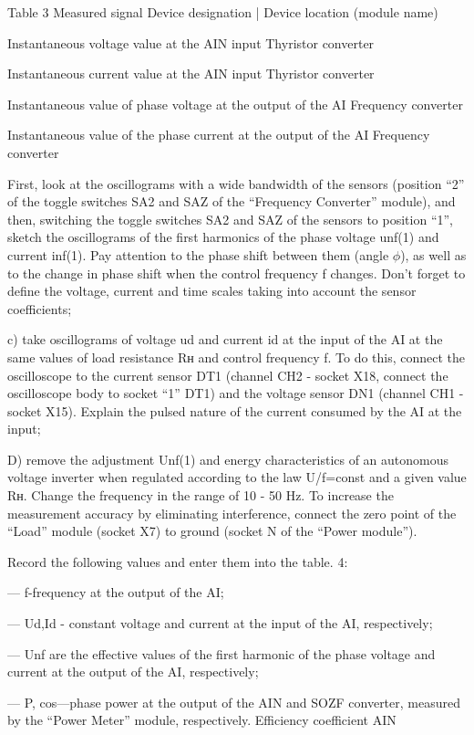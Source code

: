 \documentclass[a4paper,14pt]{article}
\begin{document}
Table 3
Measured signal
Device designation
| Device location
(module name)

Instantaneous voltage value at the AIN input
Thyristor converter


Instantaneous current value at the AIN input
  Thyristor converter

Instantaneous value of phase voltage at the output of the AI
Frequency converter

Instantaneous value of the phase current at the output of the AI
Frequency converter


First, look at the oscillograms with a wide bandwidth of the sensors (position “2” of the toggle switches SA2 and SAZ of the “Frequency Converter” module), and then, switching the toggle switches SA2 and SAZ of the sensors to position “1”, sketch the oscillograms of the first harmonics of the phase voltage unf(1) and current inf(1). Pay attention to the phase shift between them (angle $\phi$), as well as to the change in phase shift when the control frequency f changes. Don't forget to define the voltage, current and time scales taking into account the sensor coefficients;

c) take oscillograms of voltage ud and current id at the input of the AI at the same values of load resistance Rн and control frequency f. To do this, connect the oscilloscope to the current sensor DT1 (channel CH2 - socket X18, connect the oscilloscope body to socket “1” DT1) and the voltage sensor DN1 (channel CH1 - socket X15). Explain the pulsed nature of the current consumed by the AI at the input;

D) remove the adjustment Unf(1) and energy characteristics of an autonomous voltage inverter when regulated according to the law U/f=const and a given value Rн. Change the frequency in the range of 10 - 50 Hz. To increase the measurement accuracy by eliminating interference, connect the zero point of the “Load” module (socket X7) to ground (socket N of the “Power module”).

Record the following values and enter them into the table. 4:

— f-frequency at the output of the AI;

— Ud,Id - constant voltage and current at the input of the AI, respectively;

— Unf are the effective values of the first harmonic of the phase voltage and current at the output of the AI, respectively;

— P, cos—phase power at the output of the AIN and SOZF converter, measured by the “Power Meter” module, respectively.
Efficiency coefficient AIN
\end{document}
